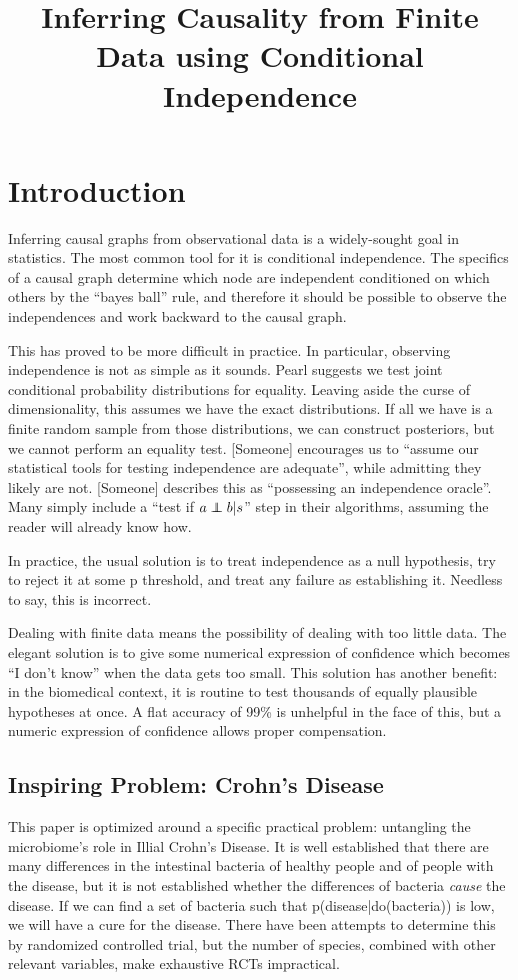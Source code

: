 \documentclass[twocolumn,12pt]{article}
\title{Inferring Causality from Finite Data using Conditional Independence}
\newcommand\indep{\protect\mathpalette{\protect\independenT}{\perp}}
\def\independenT#1#2{\mathrel{\rlap{$#1#2$}\mkern2mu{#1#2}}}
\begin{document}
\section{Introduction}

Inferring causal graphs from observational data is a widely-sought
goal in statistics.  The most common tool for it is conditional
independence.  The specifics of a causal graph determine which node
are independent conditioned on which others by the ``bayes ball''
rule, and therefore it should be possible to observe the independences
and work backward to the causal graph.

This has proved to be more difficult in practice.  In particular,
observing independence is not as simple as it sounds.  Pearl suggests
we test joint conditional probability distributions for equality.
Leaving aside the curse of dimensionality, this assumes we have the
exact distributions.  If all we have is a finite random sample from
those distributions, we can construct posteriors, but we cannot perform
an equality test.  [Someone] encourages us to ``assume our statistical
tools for testing independence are adequate'', while admitting they
likely are not.  [Someone] describes this as ``possessing an
independence oracle''.  Many simply include a ``test if $a\indep
b|s$'' step in their algorithms, assuming the reader will already know
how.

In practice, the usual solution is to treat independence as a null
hypothesis, try to reject it at some p threshold, and treat any
failure as establishing it.  Needless to say, this is incorrect.

Dealing with finite data means the possibility of dealing with too
little data.  The elegant solution is to give some numerical
expression of confidence which becomes ``I don't know'' when the data
gets too small.  This solution has another benefit: in the biomedical
context, it is routine to test thousands of equally plausible
hypotheses at once.  A flat accuracy of 99\% is unhelpful in the face
of this, but a numeric expression of confidence allows proper
compensation.

\subsection{Inspiring Problem: Crohn's Disease}

This paper is optimized around a specific practical problem:
untangling the microbiome's role in Illial Crohn's Disease.  It is
well established that there are many differences in the intestinal
bacteria of healthy people and of people with the disease, but it is
not established whether the differences of bacteria \textit{cause} the
disease.  If we can find a set of bacteria such that
p(disease|do(bacteria)) is low, we will have a cure for the disease.
There have been attempts to determine this by randomized controlled
trial, but the number of species, combined with other relevant
variables, make exhaustive RCTs impractical.
\end{document}
